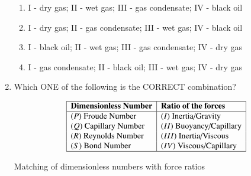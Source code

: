\documentclass[journal,12pt,onecolumn]{IEEEtran}
\theoremstyle{remark}
\begin{document}
\begin{enumerate}
\begin{enumerate}
    \item I - dry gas; II - wet gas; III - gas condensate; IV - black oil
    \item I - dry gas; II - gas condensate; III - wet gas; IV - black oil
    \item I - black oil; II - wet gas; III - gas condensate; IV - dry gas
    \item I - gas condensate; II - black oil; III - wet gas; IV - dry gas
\end{enumerate}
\hfill{}
\item  Which ONE of the following is the CORRECT combination?

\begin{table}[h!]
\centering
\[
\begin{array}{|l|l|}
\hline
\textbf{Dimensionless Number} & \textbf{Ratio of the forces} \\
\hline
(P)\ \text{Froude Number}     & (I)\ \text{Inertia/Gravity} \\
(Q)\ \text{Capillary Number}  & (II)\ \text{Buoyancy/Capillary} \\
(R)\ \text{Reynolds Number}   & (III)\ \text{Inertia/Viscous} \\
(S)\ \text{Bond Number}       & (IV)\ \text{Viscous/Capillary} \\
\hline
\end{array}
\]
\caption{Matching of dimensionless numbers with force ratios}
\label{tab:dimensionless}
\end{table}


\begin{enumerate}
\end{enumerate}
\hfill{}




\end{enumerate}
\end{document}
